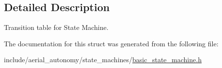 \subsection{Detailed Description}
Transition table for State Machine. 

The documentation for this struct was generated from the following file\-:\begin{DoxyCompactItemize}
\item 
include/aerial\-\_\-autonomy/state\-\_\-machines/\hyperlink{basic__state__machine_8h}{basic\-\_\-state\-\_\-machine.\-h}\end{DoxyCompactItemize}
